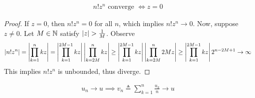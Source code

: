 \documentclass{report}
\begin{document}
\begin{theorem}
  \begin{align*}
  n!z^n\text{ converge }\iff z=0
  \end{align*}
\end{theorem}
\begin{proof}
If $z=0$, then  $n!z^n=0$ for all  $n$, which implies  $n!z^n\to 0$. Now, suppose $z\neq 0$. Let $M\in\mathbb{N}$ satisfy $\abso{z}>\frac{1}{M}$. Observe 
\begin{align*}
\left|n!z^n\right|=\left|\prod_{k=1}^n kz\right|=\left|\prod_{k=1}^{2M-1} kz \right| \left|\prod_{k=2M}^{n} kz \right|\geq \left|\prod_{k=1}^{2M-1}kz\right|\left|\prod_{k=2M}^n 2Mz\right|\geq \left|\prod_{k=1}^{2M-1}kz\right|2^{n-2M+1}\to \infty
\end{align*}
This implies $n!z^n$ is unbounded, thus diverge.
\end{proof}
\begin{theorem}
  \begin{align*}
  u_n\to u\implies v_n\triangleq \sum_{k=1}^n \frac{u_k}{n}\to u
  \end{align*}
\end{theorem}
\end{document}
